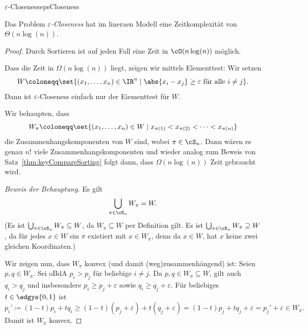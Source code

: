 \documentclass[language=ngerman,algolist,acrolist]{TemplateLecture}
\begin{document}

\begin{prob}{$\varepsilon$-Closeness}{epsCloseness}
\end{prob}

\begin{cor}
    Das Problem \emph{$\varepsilon$-Closeness} hat im lineraen Modell eine Zeitkomplexität von $\Theta(n \log(n))$.\label{cor:epsCloseness}
\end{cor}
\begin{proof}
    Durch Sortieren ist auf jeden Fall eine Zeit in $\cO(n \log(n))$ möglich.

    Dass die Zeit in $\Omega(n \log(n))$ liegt, zeigen wir mittels Elementtest: Wir setzen
    \begin{equation*}
        W \coloneqq \set{(x_1, \ldots, x_n) \in \IR^n \mid \abs{x_i - x_j} \geq \varepsilon \text{ für alle } i \neq j}.
    \end{equation*}
    Dann ist $\varepsilon$-Closeness einfach nur der Eiementtest für $W$.

    Wir behaupten, dass 
    \begin{equation*}
        W_\pi \coloneqq \set{(x_1, \ldots, x_n) \in W \mid x_{\pi(1)} < x_{\pi(2)} < \cdots < x_{\pi(n)}}
    \end{equation*}
    die Zusammenhangskomponenten von $W$ sind, wobei $\pi \in \cS_n$. Dann wären es genau $n!$ viele Zusammenhangskomponenten und wieder analog zum Beweis von Satz~\ref{thm:keyCompareSorting} folgt dann, dass $\Omega(n \log(n))$ Zeit gebraucht wird. 

    \emph{Beweis der Behauptung.} Es gilt 
    \begin{equation*}
        \bigcup_{\pi \in \cS_n} W_\pi = W.
    \end{equation*}
    (Es ist $\bigcup_{\pi \in \cS_n} W_\pi \subseteq W$, da $W_\pi \subseteq W$ per Definition gilt. Es ist $\bigcup_{\pi \in \cS_n} W_\pi \supseteq W$, da für jedes $x \in W$ ein $\pi$ existiert mit $x \in W_\pi$, denn da $x \in W$, hat $x$ keine zwei gleichen Koordinaten.)

    Wir zeigen nun, dass $W_\pi$ konvex (und damit (weg)zusammenhängend) ist: Seien $p, q \in W_\pi$. Sei oBdA $p_i > p_j$ für beliebige $i \neq j$. Da $p, q \in W_\pi \subseteq W$, gilt auch $q_i > q_j$ und insbesondere $p_i \geq p_j + \varepsilon$ sowie $q_i \geq q_j + \varepsilon$. Für beliebiges $t \in \edgys{0,1}$ ist 
    \begin{equation*}
        p_i' \coloneqq (1 - t) p_i + t q_i \geq (1 - t) (p_j + \varepsilon) + t (q_j + \varepsilon) = (1 - t) p_j + t q_j + \varepsilon = p_j' + \varepsilon \in W_\pi.
    \end{equation*}
    Damit ist $W_\pi$ konvex.


\end{proof}
\end{document}
